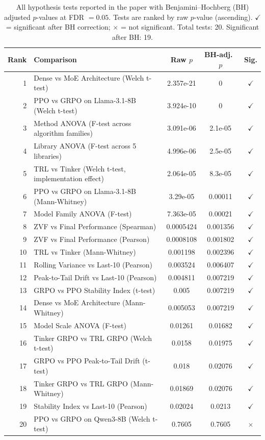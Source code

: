 \documentclass{article}
\begin{document}
\begin{table}[!ht]
\centering
\caption{All hypothesis tests reported in the paper with Benjamini--Hochberg (BH) adjusted
         $p$-values at FDR $= 0.05$.  Tests are ranked by raw $p$-value (ascending).
         $\checkmark$ = significant after BH correction; $\times$ = not significant.
         Total tests: 20.  Significant after BH: 19.}
\label{tab:bh-pvalues}
\scriptsize
\begin{tabular}{@{}rp{6.2cm}ccc@{}}
\toprule
Rank & Comparison & Raw $p$ & BH-adj.\ $p$ & Sig. \\
\midrule
        1 & Dense vs MoE Architecture (Welch t-test) & 2.357e-21 & 0 & $\checkmark$ \\
        2 & PPO vs GRPO on Llama-3.1-8B (Welch t-test) & 3.924e-10 & 0 & $\checkmark$ \\
        3 & Method ANOVA (F-test across algorithm families) & 3.091e-06 & 2.1e-05 & $\checkmark$ \\
        4 & Library ANOVA (F-test across 5 libraries) & 4.996e-06 & 2.5e-05 & $\checkmark$ \\
        5 & TRL vs Tinker (Welch t-test, implementation effect) & 2.064e-05 & 8.3e-05 & $\checkmark$ \\
        6 & PPO vs GRPO on Llama-3.1-8B (Mann-Whitney) & 3.29e-05 & 0.00011 & $\checkmark$ \\
        7 & Model Family ANOVA (F-test) & 7.363e-05 & 0.00021 & $\checkmark$ \\
        8 & ZVF vs Final Performance (Spearman) & 0.0005424 & 0.001356 & $\checkmark$ \\
        9 & ZVF vs Final Performance (Pearson) & 0.0008108 & 0.001802 & $\checkmark$ \\
        10 & TRL vs Tinker (Mann-Whitney) & 0.001198 & 0.002396 & $\checkmark$ \\
        11 & Rolling Variance vs Last-10 (Pearson) & 0.003524 & 0.006407 & $\checkmark$ \\
        12 & Peak-to-Tail Drift vs Last-10 (Pearson) & 0.004811 & 0.007219 & $\checkmark$ \\
        13 & GRPO vs PPO Stability Index (t-test) & 0.005 & 0.007219 & $\checkmark$ \\
        14 & Dense vs MoE Architecture (Mann-Whitney) & 0.005053 & 0.007219 & $\checkmark$ \\
        15 & Model Scale ANOVA (F-test) & 0.01261 & 0.01682 & $\checkmark$ \\
        16 & Tinker GRPO vs TRL GRPO (Welch t-test) & 0.0158 & 0.01975 & $\checkmark$ \\
        17 & GRPO vs PPO Peak-to-Tail Drift (t-test) & 0.018 & 0.02076 & $\checkmark$ \\
        18 & Tinker GRPO vs TRL GRPO (Mann-Whitney) & 0.01869 & 0.02076 & $\checkmark$ \\
        19 & Stability Index vs Last-10 (Pearson) & 0.02024 & 0.0213 & $\checkmark$ \\
        20 & PPO vs GRPO on Qwen3-8B (Welch t-test) & 0.7605 & 0.7605 & $\times$ \\
\bottomrule
\end{tabular}
\end{table}
\end{document}
